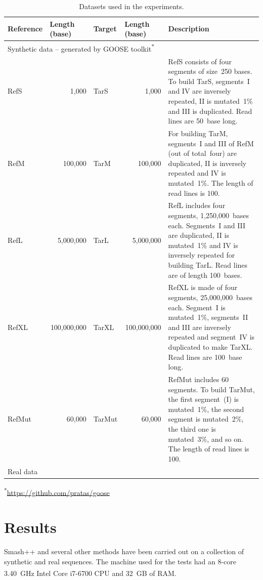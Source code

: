 \documentclass[a4paper,num-refs]{oup-contemporary}
\begin{document}
\begin{table}[h]
  \caption{Datasets used in the experiments.}
  \label{tab.dataset}
  \begin{tabularx}{\linewidth}{lrlrX}
    \toprule
    Reference & \multicolumn{1}{l}{Length (base)} & Target & \multicolumn{1}{l}{Length (base)} & Description \\
    \midrule
    \multicolumn{5}{l}{Synthetic data -- generated by GOOSE toolkit\textsuperscript{*}} \\
    \midrule
    RefS & 1,000 & TarS & 1,000 &  RefS consists of four segments of size~250 bases. To build TarS, segments~I and IV are inversely repeated, II is mutated~1\% and III is duplicated. Read lines are 50~base long. \\
    RefM & 100,000 & TarM & 100,000 & For building TarM, segments~I and III of RefM (out of total~four) are duplicated, II is inversely repeated and IV is mutated~1\%. The length of read lines is 100. \\
    RefL & 5,000,000 & TarL & 5,000,000 & RefL includes four segments, 1,250,000~bases each. Segments~I and III are duplicated, II is mutated~1\% and IV is inversely repeated for building TarL. Read lines are of length 100~bases. \\
    RefXL & 100,000,000 & TarXL & 100,000,000 & RefXL is made of four segments, 25,000,000~bases each. Segment~I is mutated~1\%, segments~II and III are inversely repeated and segment~IV is duplicated to make TarXL. Read lines are 100~base long. \\
    RefMut & 60,000 & TarMut & 60,000 & RefMut includes 60 segments. To build TarMut, the first segment~(I) is mutated~1\%, the second segment is mutated~2\%, the third one is mutated~3\%, and so on. The length of read lines is 100. \\
    \midrule
    Real data \\
    \midrule
    \bottomrule
  \end{tabularx}
  
\begin{tablenotes}
\item \textsuperscript{*}\url{https://github.com/pratas/goose}
\end{tablenotes}
\end{table}

\section{Results} \label{sec.results}
Smash++ and several other methods have been carried out on a collection of synthetic and real sequences. The machine used for the tests had an 8-core 3.40~GHz Intel\textsuperscript{\textregistered} Core{\texttrademark} i7-6700 CPU and 32~GB of RAM.
\end{document}
